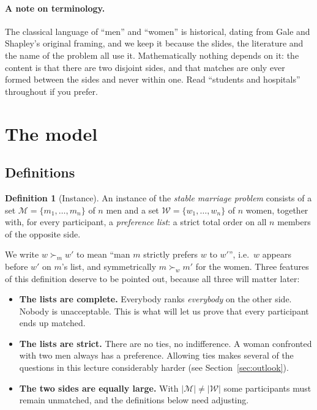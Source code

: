 \documentclass[11pt,a4paper]{article}
\theoremstyle{plain}
\theoremstyle{definition}
\newtheorem{definition}[theorem]{Definition}
\theoremstyle{remark}
\newcommand{\Men}{\mathcal{M}}
\newcommand{\Women}{\mathcal{W}}
\newcommand{\pr}[1]{\succ_{#1}}          %
\begin{document}
\paragraph{A note on terminology.}
The classical language of ``men'' and ``women'' is historical, dating from
Gale and Shapley's original framing, and we keep it because the slides,
the literature and the name of the problem all use it. Mathematically nothing
depends on it: the content is that there are two disjoint sides, and that
matches are only ever formed between the sides and never within one. Read
``students and hospitals'' throughout if you prefer.

\section{The model}\label{sec:model}

\subsection{Definitions}

\begin{definition}[Instance]
An instance of the \emph{stable marriage problem} consists of a set
$\Men = \{m_1,\dots,m_n\}$ of $n$ men and a set
$\Women = \{w_1,\dots,w_n\}$ of $n$ women, together with, for every
participant, a \emph{preference list}: a strict total order on all $n$
members of the opposite side.
\end{definition}

We write $w \pr{m} w'$ to mean ``man $m$ strictly prefers $w$ to $w'$'',
i.e.\ $w$ appears before $w'$ on $m$'s list, and symmetrically $m \pr{w} m'$
for the women. Three features of this definition deserve to be pointed out,
because all three will matter later:

\begin{itemize}
  \item \textbf{The lists are complete.} Everybody ranks \emph{everybody} on
        the other side. Nobody is unacceptable. This is what will let us prove
        that every participant ends up matched.
  \item \textbf{The lists are strict.} There are no ties, no indifference.
        A woman confronted with two men always has a preference. Allowing ties
        makes several of the questions in this lecture considerably harder
        (see Section~\ref{sec:outlook}).
  \item \textbf{The two sides are equally large.} With $|\Men| \neq |\Women|$
        some participants must remain unmatched, and the definitions below need
        adjusting.
\end{itemize}
\end{document}
